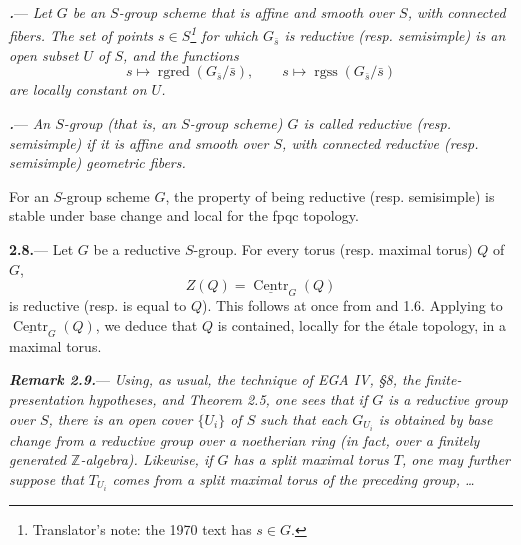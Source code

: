 \par\medskip\noindent
\textbf{\textit{.}}---
\textit{Let \(G\) be an \(S\)-group scheme that is affine and smooth
over \(S\), with connected fibers.  The set of points \(s\in S\)\footnote{Translator's note: the 1970 text has \(s\in G\).} for
which \(G_{\bar s}\) is reductive \textup{(resp. semisimple)} is an
open subset \(U\) of \(S\), and the functions}
\[
  s\longmapsto\operatorname{rgred}(G_{\bar s}/\bar s),
  \qquad
  s\longmapsto\operatorname{rgss}(G_{\bar s}/\bar s)
\]
\textit{are locally constant on \(U\).}

\par\medskip\noindent
\textbf{\textit{.}}---
\textit{An \(S\)-group \textup{(that is, an \(S\)-group scheme)}
\(G\) is called \emph{reductive} \textup{(resp. \emph{semisimple})}
if it is affine and smooth over \(S\), with connected reductive
\textup{(resp. semisimple)} geometric fibers.}

For an \(S\)-group scheme \(G\), the property of being reductive
(resp. semisimple) is stable under base change and local for the fpqc
topology.

\par\medskip\noindent
\textbf{2.8.}---
Let \(G\) be a reductive \(S\)-group.  For every torus
(resp. maximal torus) \(Q\) of \(G\),
\[
  Z(Q)=\underline{\operatorname{Centr}}_G(Q)
\]
is reductive (resp. is equal to \(Q\)).  This follows at once from 
and 1.6.  Applying  to
\(\underline{\operatorname{Centr}}_G(Q)\), we deduce that \(Q\) is
contained, locally for the étale topology, in a maximal torus.

\par\medskip\noindent
\textbf{\textit{Remark 2.9.}}---
\textit{Using, as usual, the technique of EGA IV,
§8, the finite-presentation hypotheses, and Theorem 2.5, one sees
that if \(G\) is a reductive group over \(S\), there is an open cover
\(\{U_i\}\) of \(S\) such that each \(G_{U_i}\) is obtained by base
change from a reductive group over a noetherian ring \textup{(in fact,
over a finitely generated \(\mathbb Z\)-algebra)}.  Likewise, if \(G\)
has a split maximal torus \(T\), one may further suppose that
\(T_{U_i}\) comes from a split maximal torus of the preceding
group, \ldots}


